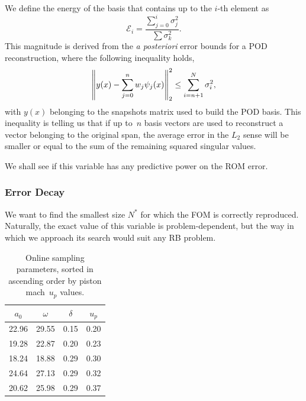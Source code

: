 \documentclass[../../thesis.tex]{subfiles}
\begin{document}
We define the energy of the basis that contains up to the $i$-th element as
\begin{equation}
    \mathcal{E}_i = \frac{\sum_{j=0}^{i}\sigma_j^2}{\sum \sigma_k^2}.
\end{equation}
This magnitude is derived from the \textit{a posteriori} error bounds 
for a POD reconstruction, where the following inequality holds,
\begin{equation}
    \norm{y(x) - \sum_{j=0}^{n} w_j \psi_j(x)}_{2}^{2} \leq \sum_{i = n+1}^{N} \sigma_i^2,
\end{equation}
with $y(x)$ belonging to the snapshots matrix used to build the POD basis.
This inequality is telling us that if up to~$n$ basis vectors are used
to reconstruct a vector belonging to the original span,
the average error in the $L_2$ sense will be smaller or equal
to the sum of the remaining squared singular values.

We shall see if this variable has any predictive power on the ROM error.

\subsubsection{Error Decay}
We want to find the smallest size $N^{*}$ for which the FOM is correctly reproduced.
Naturally, the exact value of this variable is problem-dependent, 
but the way in which we approach its search would suit any RB problem.
\begin{table}[h]
    \centering
    \caption{Online sampling parameters, 
    sorted in ascending order by piston mach~$u_p$ values.}
    \begin{tabular}{cccc}
    \toprule
        $a_0$ & $\omega$ & $\delta$ & $u_p$
        \\ \midrule
        22.96 &   29.55 & 0.15 &           0.20 \\
        19.28 &   22.87 & 0.20 &           0.23 \\
        18.24 &   18.88 & 0.29 &           0.30 \\
        24.64 &   27.13 & 0.29 &           0.32 \\
        20.62 &   25.98 & 0.29 &           0.37
        \\ \bottomrule
    \end{tabular}
\end{table}
\end{document}
